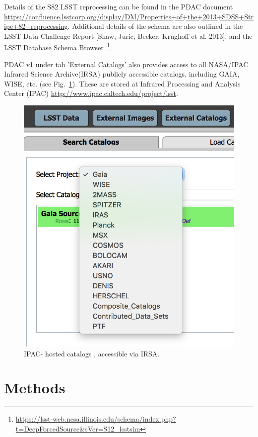 \documentclass[fleqn,usenatbib]{mnras} %
\begin{document}
Details of  the S82 LSST reprocessing can be found in the PDAC document \url{https://confluence.lsstcorp.org/display/DM/Properties+of+the+2013+SDSS+Stripe+82+reprocessing}. Additional details of the schema are also outlined in the LSST Data Challenge Report [Shaw, Juric, Becker, Krughoff et al. 2013], and the LSST Database Schema Browser~\footnote{\url{https://lsst-web.ncsa.illinois.edu/schema/index.php?t=DeepForcedSource&sVer=S12_lsstsim}}. 

PDAC v1 under tab 'External Catalogs' also provides access to  all NASA/IPAC Infrared Science Archive(IRSA) publicly accessible catalogs, including GAIA, WISE, etc. (see Fig.~\ref{fig:PDAC_external_cat}). These are stored at Infrared Processing and Analysis Center (IPAC) \url{http://www.ipac.caltech.edu/project/lsst}.


\begin{figure}
\includegraphics[width=\columnwidth]{2_PDAC_externals}
\caption{IPAC- hosted catalogs , accessible via IRSA. }
\label{fig:PDAC_external_cat}
\end{figure}



\section{Methods}
\end{document}
